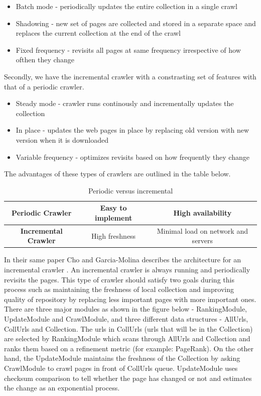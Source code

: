 \documentclass[a4paper, 11pt]{article} %
\begin{document}
\begin{itemize}
\item Batch mode - periodically updates the entire collection in a single crawl
\item Shadowing - new set of pages are collected and stored in a separate space and replaces the current collection at the end of the crawl
\item Fixed frequency - revisits all pages at same frequency irrespective of how ofthen they change
\end{itemize} 

Secondly, we have the incremental crawler with a constrasting set of features with that of a periodic crawler.

\begin{itemize}

\item Steady mode - crawler runs continously and incrementally updates the collection
\item In place - updates the web pages in place by replacing old version with new version when it is downloaded
\item Variable frequency - optimizes revisits based on how frequently they change 

\end{itemize}

The advantages of these types of crawlers are outlined in the table below.

\begin{table}[h]
\begin{tabular}{|c|c|c|}
\hline 
\textbf{Periodic Crawler} & Easy to implement & High availability \\ 
\hline 
\textbf{Incremental Crawler }& High freshness & Minimal load on network and servers \\ 
\hline
\end{tabular} 
\caption{Periodic versus incremental} 
\end{table}

In their same paper Cho and Garcia-Molina describes the architecture for an incremental crawler \cite{cho1999evolution}. An incremental crawler is always running and periodically revisits the pages. This type of crawler should satisfy two goals during this process such as maintaining the freshness of local collection and improving quality of repository by replacing less important pages with more important ones. There are three major modules as shown in the figure below - RankingModule, UpdateModule and CrawlModule, and three different data structures - AllUrls, CollUrls and Collection. The urls in CollUrls (urls that will be in the Collection) are selected by RankingModule which scans through AllUrls and Collection and ranks them based on a refinement metric (for example: PageRank). On the other hand, the UpdateModule maintains the freshness of the Collection by asking CrawlModule to crawl pages in front of CollUrls queue. UpdateModule uses checksum comparison to tell whether the page has changed or not and estimates the change as an exponential process. 
\end{document}
